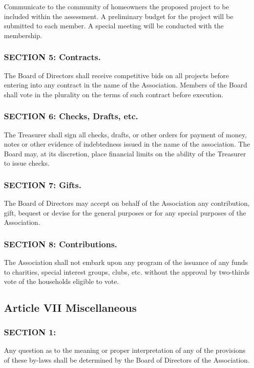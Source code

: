 Communicate to the community of homeowners the proposed project to be
included within the assessment.  A preliminary budget for the project
will be submitted to each member.  A special meeting will be conducted
with the membership.

\subsubsection{SECTION 5: Contracts.}
The Board of Directors shall receive competitive bids on all projects
before entering into any contract in the name of the Association. Members
of the Board shall vote in the plurality on the terms of such contract
before execution.

\subsubsection{SECTION 6: Checks, Drafts, etc.}
The Treasurer shall sign all checks, drafts, or other orders for payment
of money, notes or other evidence of indebtedness issued in the name
of the association. The Board may, at its discretion, place financial
limits on the ability of the Treasurer to issue checks.

\subsubsection{SECTION 7: Gifts.}
The Board of Directors may accept on behalf of the Association any
contribution, gift, bequest or devise for the general purposes or for
any special purposes of the Association.

\subsubsection{SECTION 8: Contributions.}
The Association shall not embark upon any program of the issuance of
any funds to charities, special interest groups, clubs, etc. without
the approval by two-thirds vote of the households eligible to vote.

\subsection{Article VII Miscellaneous}

\subsubsection{SECTION 1:}
Any question as to the meaning or proper interpretation of any of the
provisions of these by-laws shall be determined by the Board of Directors
of the Association.


